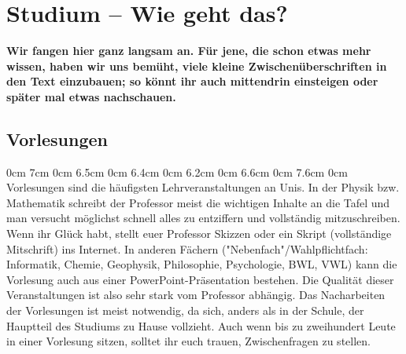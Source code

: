 \section{Studium -- Wie geht das?}
\begin{multicols}{2}
\renewcommand{\fibelsubsectionpre}{\fibelsubsubsectionpre}
\renewcommand{\fibelsubsectionpost}{\fibelsubsubsectionpost}

\textbf{Wir fangen hier ganz langsam an. Für jene, die schon etwas mehr wissen, haben wir uns bemüht, viele kleine Zwischenüberschriften in den Text einzubauen; so könnt ihr auch mittendrin einsteigen oder später mal etwas nachschauen.}

\subsection*{Vorlesungen}
0cm \columnwidth
0cm \columnwidth
0cm \columnwidth
0cm \columnwidth
0cm \columnwidth
0cm \columnwidth
0cm \columnwidth
0cm \columnwidth
0cm \columnwidth
0cm \columnwidth
0cm \columnwidth
0cm \columnwidth
0cm 7cm
0cm 6.5cm
0cm 6.4cm
0cm 6.2cm
0cm 6.6cm
0cm 7.6cm
0cm \columnwidth
Vorlesungen sind die häufigsten Lehrveranstaltungen an Unis. In der Physik bzw. Mathematik schreibt der Professor meist die wichtigen Inhalte an die Tafel und man versucht möglichst schnell alles zu entziffern und vollständig mitzuschreiben. Wenn ihr Glück habt, stellt euer Professor Skizzen oder ein Skript (vollständige Mitschrift) ins Internet. In anderen Fächern ("Nebenfach"/Wahlpflichtfach: Informatik, Chemie, Geophysik, Philosophie, Psychologie, BWL, VWL) kann die Vorlesung auch aus einer PowerPoint-Präsentation bestehen. Die Qualität dieser Veranstaltungen ist also sehr stark vom Professor abhängig. Das Nacharbeiten der Vorlesungen ist meist notwendig, da sich, anders als in der Schule,
\vspace{1cm}
der Hauptteil des Studiums zu Hause vollzieht. Auch wenn bis zu zweihundert Leute in einer Vorlesung sitzen, solltet ihr euch trauen, Zwischenfragen zu stellen.


\end{multicols}
